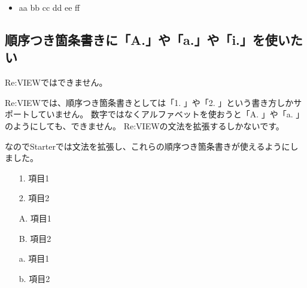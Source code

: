 \begin{starterprogram}\end{starterprogram}
\noindent
{}

\starterresult

\begin{itemize}
\item aa bb
   cc dd
   ee ff
\end{itemize}

\endstarterresult

\subsection{順序つき箇条書きに「A.」や「a.」や「i.」を使いたい}
\label{sec:2-2-2}

Re:VIEWではできません。

Re:VIEWでは、順序つき箇条書きとしては「1. 」や「2. 」という書き方しかサポートしていません。
数字ではなくアルファベットを使おうと「A. 」や「a. 」のようにしても、できません。
Re:VIEWの文法を拡張するしかないです。

なのでStarterでは文法を拡張し、これらの順序つき箇条書きが使えるようにしました。

\begin{starterprogram}\end{starterprogram}
\noindent
{}

\starterresult

\begin{enumerate}
\item[1.] 項目1
\item[2.] 項目2
\end{enumerate}

\begin{enumerate}
\item[A.] 項目1
\item[B.] 項目2
\end{enumerate}

\begin{enumerate}
\item[a.] 項目1
\item[b.] 項目2
\end{enumerate}

\endstarterresult

